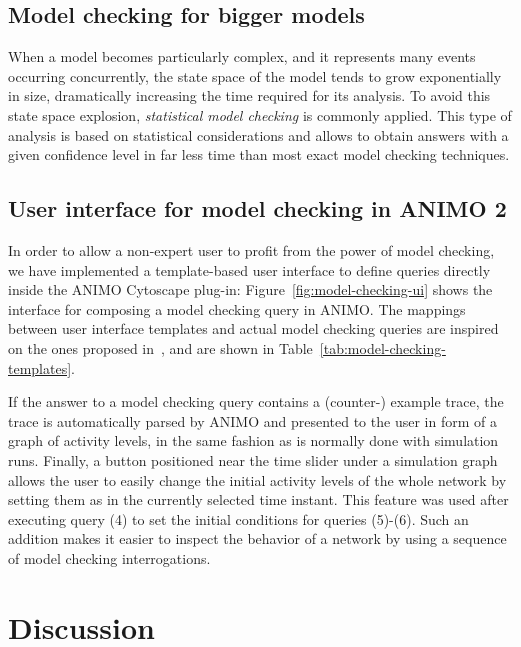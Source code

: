 \documentclass{bmcart}
\begin{document}
\subsection*{Model checking for bigger models}
When a model becomes particularly complex, and it represents many events occurring concurrently,
the state space of the model tends to grow exponentially in size, dramatically
increasing the time required for its analysis. To avoid this state space explosion,
\emph{statistical model checking} is commonly applied. This type of analysis is based on statistical
considerations and allows to obtain answers with a given confidence level in far less time
than most exact model checking techniques.



\subsection*{User interface for model checking in ANIMO 2}\label{sec:animo-model-checking-ui}
In order to allow a non-expert user to profit from the power of model checking, we have implemented
a template-based user interface to define queries directly inside the ANIMO Cytoscape plug-in:
Figure~\ref{fig:model-checking-ui} shows the interface for composing a model checking query in ANIMO.
The mappings between user interface templates and actual model checking queries are inspired
on the ones proposed in~\cite{hidde-templates}, and are shown in Table~\ref{tab:model-checking-templates}.



If the answer to a model checking query contains a (counter-) example trace, the trace
is automatically parsed by ANIMO and presented to the user in form of a graph of activity levels, in the same fashion
as is normally done with simulation runs.
Finally, a button positioned near the time slider under a simulation graph allows the user to easily change
the initial activity levels of the whole network by setting them as in the currently selected time instant.
This feature was used after executing query (4) to set the initial conditions for queries (5)-(6).
Such an addition makes it easier to inspect the behavior of a network by using a sequence of model checking interrogations.






\section*{Discussion}
\end{document}
